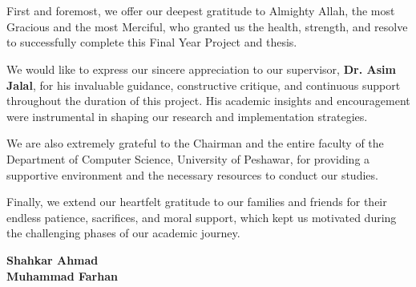 \cleardoublepage
{}

\chapter*{}

First and foremost, we offer our deepest gratitude to Almighty Allah, the most Gracious and the most Merciful, who granted us the health, strength, and resolve to successfully complete this Final Year Project and thesis.

We would like to express our sincere appreciation to our supervisor, \textbf{Dr. Asim Jalal}, for his invaluable guidance, constructive critique, and continuous support throughout the duration of this project. His academic insights and encouragement were instrumental in shaping our research and implementation strategies.

We are also extremely grateful to the Chairman and the entire faculty of the Department of Computer Science, University of Peshawar, for providing a supportive environment and the necessary resources to conduct our studies.

Finally, we extend our heartfelt gratitude to our families and friends for their endless patience, sacrifices, and moral support, which kept us motivated during the challenging phases of our academic journey.

\vspace{4em}

\begin{flushright}
	\textbf{Shahkar Ahmad} \\
	\textbf{Muhammad Farhan}
\end{flushright}

\newpage
